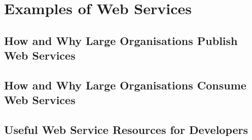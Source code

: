 \chapter{Examples of Web Services}

\section{How and Why Large Organisations Publish Web Services}
\section{How and Why Large Organisations Consume Web Services}
\section{Useful Web Service Resources for Developers}
